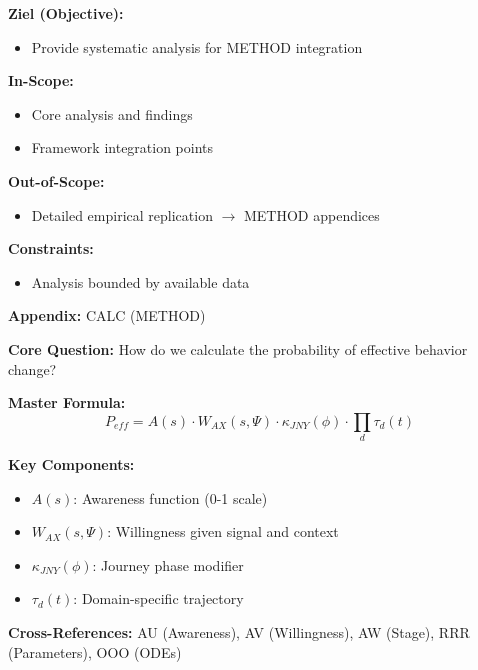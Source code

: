 \begin{tcolorbox}[
    colback=orange!5!white,
    colframe=orange!75!black,
    title={\textbf{Appendix Scope: Ziel / In-Scope / Out-of-Scope / Constraints}},
    fonttitle=\bfseries
]

\textbf{Ziel (Objective):}
\begin{itemize}[nosep]
    \item Provide systematic analysis for METHOD integration
\end{itemize}

\textbf{In-Scope:}
\begin{itemize}[nosep]
    \item Core analysis and findings
    \item Framework integration points
\end{itemize}

\textbf{Out-of-Scope:}
\begin{itemize}[nosep]
    \item Detailed empirical replication $\rightarrow$ METHOD appendices
\end{itemize}

\textbf{Constraints:}
\begin{itemize}[nosep]
    \item Analysis bounded by available data
\end{itemize}

\end{tcolorbox}

\begin{tcolorbox}[colback=blue!5!white, colframe=blue!75!black,
    title=Quick Reference: EBF Calculation Master]
\textbf{Appendix:} CALC (METHOD)


\textbf{Core Question:} How do we calculate the probability of effective behavior change?

\textbf{Master Formula:}
\begin{equation}
P_{eff} = A(s) \cdot W_{AX}(s, \Psi) \cdot \kappa_{JNY}(\phi) \cdot \prod_d \tau_d(t)
\label{eq:peff-master}
\end{equation}

\textbf{Key Components:}
\begin{itemize}[nosep]
\item $A(s)$: Awareness function (0-1 scale)
\item $W_{AX}(s, \Psi)$: Willingness given signal and context
\item $\kappa_{JNY}(\phi)$: Journey phase modifier
\item $\tau_d(t)$: Domain-specific trajectory
\end{itemize}

\textbf{Cross-References:} AU (Awareness), AV (Willingness), AW (Stage), RRR (Parameters), OOO (ODEs)
\end{tcolorbox}


